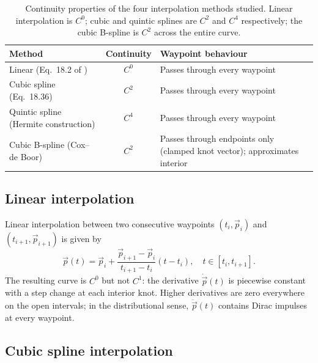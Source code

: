 \begin{table}[!t]
\centering
\caption{Continuity properties of the four interpolation methods
studied. Linear interpolation is $C^0$; cubic and quintic splines
are $C^2$ and $C^4$ respectively; the cubic B-spline is $C^2$
across the entire curve.}
\label{tab:continuity-classes}
\begin{tabularx}{\linewidth}{lcX}
\toprule
\textbf{Method} & \textbf{Continuity} & \textbf{Waypoint behaviour} \\
\midrule
Linear (Eq.~18.2 of \cite{chapra2021})         & $C^0$ & Passes through every waypoint \\
Cubic spline (Eq.~18.36)                       & $C^2$ & Passes through every waypoint \\
Quintic spline (Hermite construction)          & $C^4$ & Passes through every waypoint \\
Cubic B-spline (Cox--de Boor) \cite{piegl1997nurbs} & $C^2$ & Passes through endpoints only (clamped knot vector); approximates interior \\
\bottomrule
\end{tabularx}
\end{table}

\subsection{Linear interpolation}
\label{sec:bg-linear}

Linear interpolation between two consecutive waypoints
$(t_i, \vec{p}_i)$ and $(t_{i+1}, \vec{p}_{i+1})$ is given
by~\cite[Eq.~18.2]{chapra2021}
\begin{equation}
\vec{p}(t) = \vec{p}_i + \frac{\vec{p}_{i+1} - \vec{p}_i}{t_{i+1} - t_i}
             (t - t_i), \quad t \in [t_i, t_{i+1}].
\label{eq:linear}
\end{equation}
The resulting curve is $C^0$ but not $C^1$: the derivative $\dot{\vec{p}}(t)$
is piecewise constant with a step change at each interior knot.
Higher derivatives are zero everywhere on the open intervals; in the
distributional sense, $\ddot{\vec{p}}(t)$ contains Dirac impulses at
every waypoint.

\subsection{Cubic spline interpolation}
\label{sec:bg-cubic}

